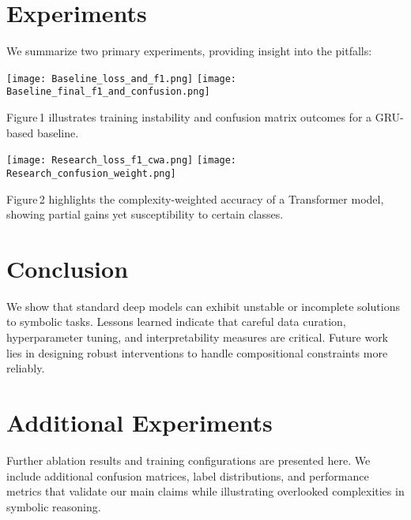 \documentclass{article}
\begin{document}
\section{Experiments}
We summarize two primary experiments, providing insight into the pitfalls:
\begin{center}
\texttt{[image: Baseline\_loss\_and\_f1.png]}
\texttt{[image: Baseline\_final\_f1\_and\_confusion.png]}
\end{center}
Figure\,1 illustrates training instability and confusion matrix outcomes for a GRU-based baseline. 

\begin{center}
\texttt{[image: Research\_loss\_f1\_cwa.png]}
\texttt{[image: Research\_confusion\_weight.png]}
\end{center}
Figure\,2 highlights the complexity-weighted accuracy of a Transformer model, showing partial gains yet susceptibility to certain classes.

\section{Conclusion}
We show that standard deep models can exhibit unstable or incomplete solutions to symbolic tasks. Lessons learned indicate that careful data curation, hyperparameter tuning, and interpretability measures are critical. Future work lies in designing robust interventions to handle compositional constraints more reliably.




\appendix

\section{Additional Experiments}
Further ablation results and training configurations are presented here. We include additional confusion matrices, label distributions, and performance metrics that validate our main claims while illustrating overlooked complexities in symbolic reasoning.
\end{document}
